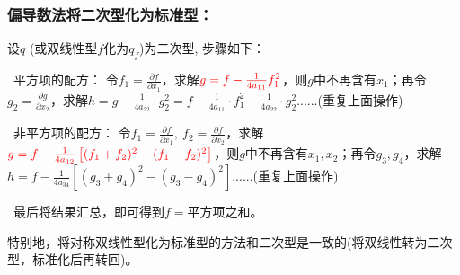 \documentclass[zihao=-4,UTF8]{report}
\theoremstyle{mystyle} %
\begin{document}
\subsubsection{偏导数法将二次型化为标准型：}
设$q$ (或双线性型$f$化为$q_f$)为二次型, 步骤如下：
\par
{}\ 平方项的配方：
令$f_1 = \frac{\partial f}{\partial x_1}$，求解$\textcolor{red}{g = f - \frac{1}{4a_{11}} f_1^2}$，则$g$中不再含有$x_1$；再令$g_2 = \frac{\partial g}{\partial x_2}$，求解$h = g - \frac{1}{4a_{22}}\cdot g_2^2 =f - \frac{1}{4a_{11}}\cdot f_1^2 - \frac{1}{4a_{22}}\cdot g_2^2$......(重复上面操作)   \par
{}\  非平方项的配方：
令$f_1 = \frac{\partial f}{\partial x_1},\  f_2 = \frac{\partial f}{\partial x_2}$，求解$\textcolor{red}{g = f - \frac{1}{4a_{12}}\left[ (f_1+f_2)^2 - (f_1-f_2)^2 \right]}$，则$g$中不再含有$x_1,x_2$；再令$ g_3,g_4 $，求解$h = f - \frac{1}{4a_{34}}\left[ (g_3+g_4)^2 - (g_3-g_4)^2 \right]$......(重复上面操作)
\par
{}\  最后将结果汇总，即可得到$f = $平方项之和。   \par


特别地，将对称双线性型化为标准型的方法和二次型是一致的(将双线性转为二次型，标准化后再转回)。
\end{document}
